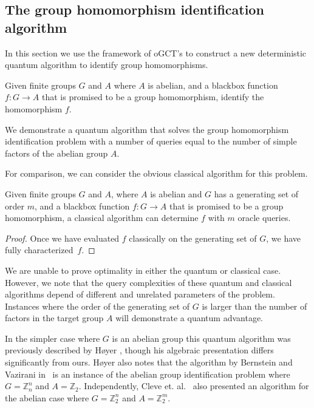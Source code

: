 \subsection{The group homomorphism identification algorithm}
\label{sec:grouphomid}

In this section we use the framework of oGCT's to construct a new deterministic quantum algorithm to identify  group homomorphisms.  
\begin{defn}
Given finite groups $G$ and $A$ where $A$ is abelian, and a blackbox function $f:G\to A$ that is promised to be a group homomorphism, identify the homomorphism $f$.
\end{defn}

\noindent
We demonstrate a quantum algorithm that solves the group homomorphism identification problem with a number of queries equal to the number of simple factors of the abelian group $A$.

For comparison, we can consider the obvious classical algorithm for this problem.
\begin{lemma}
Given finite groups $G$ and $A$, where $A$ is abelian and $G$ has a generating set of order $m$, and a blackbox function $f:G\to A$ that is promised to be a group homomorphism, a classical algorithm can determine $f$ with $m$ oracle queries.
\end{lemma}
\begin{proof}
Once we have evaluated $f$ classically on the generating set of $G$, we have fully characterized~$f$. 
\end{proof}

\noindent
We are unable to prove optimality in either the quantum or classical case. However, we note that the query complexities of these quantum and classical algorithms depend of different and unrelated parameters of the problem. Instances where the order of the generating set of $G$ is larger than the number of factors in the target group $A$ will demonstrate a quantum advantage. 

In  the simpler case where $G$ is an abelian group this quantum algorithm was previously described by H\o yer \cite{hoyer1999conjugated}, though his algebraic presentation differs significantly from ours. H\o yer also notes that the algorithm by Bernstein and Vazirani in~\cite{bernstein1993quantum} is an instance of the abelian group identification problem where $G=\mathbb{Z}_n^n$ and $A=\mathbb{Z}_2$. Independently, Cleve et. al.~\cite{cleve1998quantum} also presented an algorithm for the abelian case where $G=\mathbb{Z}_2^n$ and $A=\mathbb{Z}_2^m$.

